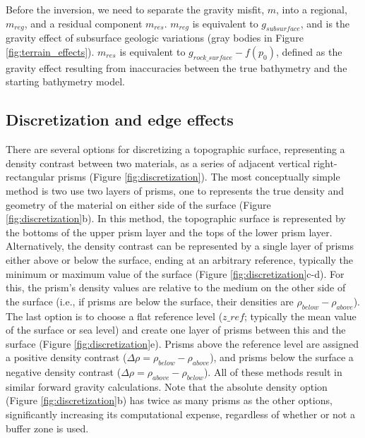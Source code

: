 \documentclass[tc, manuscript]{copernicus}
\begin{document}
Before the inversion, we need to separate the gravity misfit, $m$, into a regional, $m_{reg}$, and a residual component $m_{res}$. ${m}_{reg}$ is equivalent to $g_{subsurface}$, and is the gravity effect of subsurface geologic variations (gray bodies in Figure \ref{fig:terrain_effects}). $m_{res}$ is equivalent to $g_{rock{\_}surface} - f(p_0)$, defined as the gravity effect resulting from inaccuracies between the true bathymetry and the starting bathymetry model.

\subsection{Discretization and edge effects}\label{app:discretization}

There are several options for discretizing a topographic surface, representing a density contrast between two materials, as a series of adjacent vertical right-rectangular prisms (Figure \ref{fig:discretization}). The most conceptually simple method is two use two layers of prisms, one to represents the true density and geometry of the material on either side of the surface (Figure \ref{fig:discretization}b). In this method, the topographic surface is represented by the bottoms of the upper prism layer and the tops of the lower prism layer. Alternatively, the density contrast can be represented by a single layer of prisms either above or below the surface, ending at an arbitrary reference, typically the minimum or maximum value of the surface (Figure \ref{fig:discretization}c-d). For this, the prism’s density values are relative to the medium on the other side of the surface (i.e., if prisms are below the surface, their densities are $\rho_{below} - \rho_{above}$). The last option is to choose a flat reference level ($z\_ref$; typically the mean value of the surface or sea level) and create one layer of prisms between this and the surface (Figure \ref{fig:discretization}e). Prisms above the reference level are assigned a positive density contrast ($\Delta{\rho} = \rho_{below} − \rho_{above}$), and prisms below the surface a negative density contrast ($\Delta{\rho} = \rho_{above} − \rho_{below}$). All of these methods result in similar forward gravity calculations. Note that the absolute density option (Figure \ref{fig:discretization}b) has twice as many prisms as the other options, significantly increasing its computational expense, regardless of whether or not a buffer zone is used.
\end{document}
